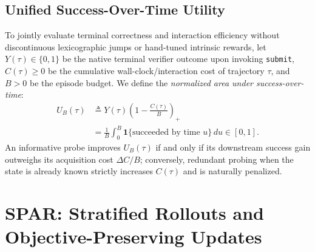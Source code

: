 \documentclass[11pt]{article}
\theoremstyle{definition}
\theoremstyle{remark}
\newcommand{\prism}{\textsc{SPAR}}
\newcommand{\UB}{U_B}
\begin{document}
\subsection{Unified Success-Over-Time Utility}
\label{subsec:utility}
To jointly evaluate terminal correctness and interaction efficiency without discontinuous lexicographic jumps or hand-tuned intrinsic rewards, let $Y(\tau) \in \{0, 1\}$ be the native terminal verifier outcome upon invoking \texttt{submit}, $C(\tau) \ge 0$ be the cumulative wall-clock/interaction cost of trajectory $\tau$, and $B > 0$ be the episode budget. We define the \emph{normalized area under success-over-time}:
\begin{align}
    \UB(\tau) &\triangleq Y(\tau)\left(1 - \frac{C(\tau)}{B}\right)_+ \nonumber \\
    &= \frac{1}{B}\int_0^B \mathbf{1}\bigl\{\text{succeeded by time } u\bigr\}\,du \in [0, 1].
    \label{eq:ub_utility}
\end{align}
An informative probe improves $\UB(\tau)$ if and only if its downstream success gain outweighs its acquisition cost $\Delta C / B$; conversely, redundant probing when the state is already known strictly increases $C(\tau)$ and is naturally penalized.

\section{\prism{}: Stratified Rollouts and Objective-Preserving Updates}
\label{sec:method}
\end{document}
